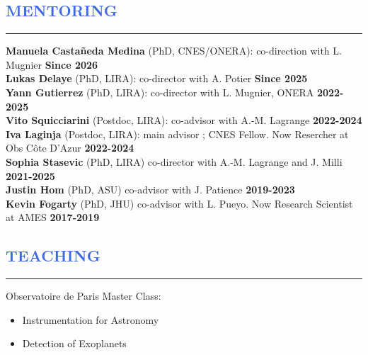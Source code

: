 \documentclass[11pt]{article}
\begin{document}
\vspace{-1.cm}
\textcolor{RoyalBlue}{\section{\large MENTORING}
\vspace{-0.35cm}\hrule}
\vspace{0.25cm}
{\small
\textbf{Manuela Castañeda Medina} (PhD, CNES/ONERA): co-direction with L. Mugnier \hfill \textbf{Since 2026}\\
\textbf{Lukas Delaye} (PhD, LIRA): co-director with A. Potier \hfill \textbf{Since 2025}\\
\textbf{Yann Gutierrez} (PhD, LIRA): co-director with L. Mugnier, ONERA \hfill \textbf{2022-2025}\\
\textbf{Vito Squicciarini} (Postdoc, LIRA): co-advisor with A.-M. Lagrange \hfill \textbf{2022-2024}\\
\textbf{Iva Laginja} (Postdoc, LIRA): main advisor ; CNES Fellow. Now Resercher at Obs Côte D'Azur \hfill \textbf{2022-2024}\\
\textbf{Sophia Stasevic} (PhD, LIRA) co-director with A.-M. Lagrange and J. Milli \hfill \textbf{2021-2025}\\
\textbf{Justin Hom} (PhD, ASU) co-advisor with J. Patience \hfill \textbf{2019-2023}\\
\textbf{Kevin Fogarty} (PhD, JHU) co-advisor with L. Pueyo. Now Research Scientist at AMES \hfill \textbf{2017-2019}\\
}
\vspace{-0.3cm}
\textcolor{RoyalBlue}{\section{\large TEACHING}
\vspace{-0.35cm}\hrule}
\vspace{0.25cm}
Observatoire de Paris Master Class: 
\begin{itemize} \itemsep -2pt
    \item Instrumentation for Astronomy 
    \item Detection of Exoplanets
\end{itemize}
\end{document}
